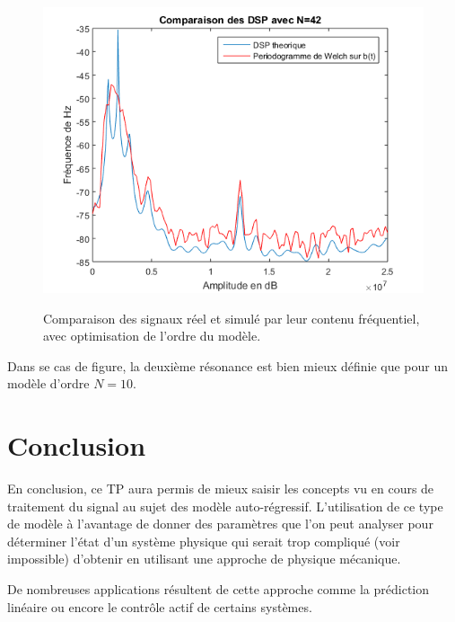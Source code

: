 \documentclass[a4paper]{article}
\begin{document}
\begin{figure}[!h]
	\centering
	\includegraphics[scale=0.5]{otpi.png}
    \label{opti}
    \caption{Comparaison des signaux réel et simulé par leur contenu fréquentiel, avec optimisation de l'ordre du modèle.}
\end{figure}

Dans se cas de figure, la deuxième résonance est bien mieux définie que pour un modèle d'ordre $N=10$.

\section{Conclusion}
En conclusion, ce TP aura permis de mieux saisir les concepts vu en cours de traitement du signal au sujet des modèle auto-régressif. L'utilisation de ce type de modèle à l'avantage de donner des paramètres que l'on peut analyser pour déterminer l'état d'un système physique qui serait trop compliqué (voir impossible) d'obtenir en utilisant une approche de physique mécanique.

De nombreuses applications résultent de cette approche comme la prédiction linéaire ou encore le contrôle actif de certains systèmes.

 

\newpage
\end{document}
